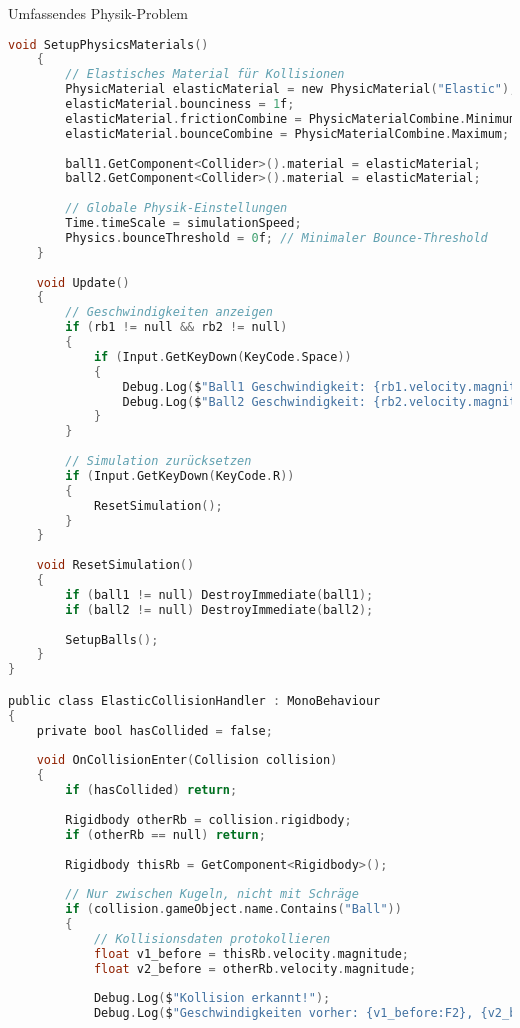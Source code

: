 \begin{example2}{Umfassendes Physik-Problem}
\begin{lstlisting}[language=C, style=basesmol]
    void SetupPhysicsMaterials() 
    {
        // Elastisches Material für Kollisionen
        PhysicMaterial elasticMaterial = new PhysicMaterial("Elastic");
        elasticMaterial.bounciness = 1f;
        elasticMaterial.frictionCombine = PhysicMaterialCombine.Minimum;
        elasticMaterial.bounceCombine = PhysicMaterialCombine.Maximum;
        
        ball1.GetComponent<Collider>().material = elasticMaterial;
        ball2.GetComponent<Collider>().material = elasticMaterial;
        
        // Globale Physik-Einstellungen
        Time.timeScale = simulationSpeed;
        Physics.bounceThreshold = 0f; // Minimaler Bounce-Threshold
    }
    
    void Update() 
    {
        // Geschwindigkeiten anzeigen
        if (rb1 != null && rb2 != null) 
        {
            if (Input.GetKeyDown(KeyCode.Space)) 
            {
                Debug.Log($"Ball1 Geschwindigkeit: {rb1.velocity.magnitude:F2} m/s");
                Debug.Log($"Ball2 Geschwindigkeit: {rb2.velocity.magnitude:F2} m/s");
            }
        }
        
        // Simulation zurücksetzen
        if (Input.GetKeyDown(KeyCode.R)) 
        {
            ResetSimulation();
        }
    }
    
    void ResetSimulation() 
    {
        if (ball1 != null) DestroyImmediate(ball1);
        if (ball2 != null) DestroyImmediate(ball2);
        
        SetupBalls();
    }
}

public class ElasticCollisionHandler : MonoBehaviour 
{
    private bool hasCollided = false;
    
    void OnCollisionEnter(Collision collision) 
    {
        if (hasCollided) return;
        
        Rigidbody otherRb = collision.rigidbody;
        if (otherRb == null) return;
        
        Rigidbody thisRb = GetComponent<Rigidbody>();
        
        // Nur zwischen Kugeln, nicht mit Schräge
        if (collision.gameObject.name.Contains("Ball")) 
        {
            // Kollisionsdaten protokollieren
            float v1_before = thisRb.velocity.magnitude;
            float v2_before = otherRb.velocity.magnitude;
            
            Debug.Log($"Kollision erkannt!");
            Debug.Log($"Geschwindigkeiten vorher: {v1_before:F2}, {v2_before:F2}");
            

\end{lstlisting}
\end{example2}
